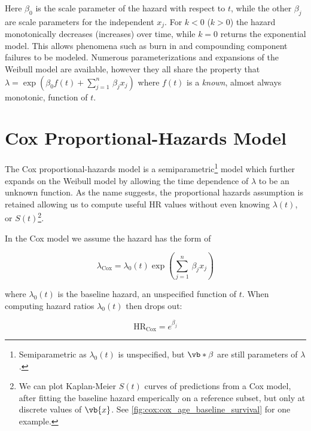 \noindent Here $\beta_{0}$ is the scale parameter of the hazard with respect to $t$,
while the other $\beta_{j}$ are scale parameters for the independent $x_{j}$.
For $k<0$ ($k>0$) the hazard monotonically decreases (increases) over time,
while $k=0$ returns the exponential model.
This allows phenomena such as burn in and compounding component failures to be modeled.
Numerous parameterizations and expansions of the Weibull model are available,
however they all share the property that
$\lambda = \exp\left(\beta_{0} f\left(t\right) + \sum_{j=1}^{n}\, \beta_{j} x_{j}\right)$
where $f\left(t\right)$ is a {\em known}, almost always monotonic, function of $t$.

\section{Cox Proportional-Hazards Model}
\label{survival:cox}

The Cox proportional-hazards model \cite{cox} is a
semiparametric\footnote{Semiparametric as $\lambda_{0}\left(t\right)$ is unspecified, but $\vb*{\beta}$ are still parameters of $\lambda$.} model
which further expands on the Weibull model by allowing
the time dependence of $\lambda$ to be an unknown function.
As the name suggests, the proportional hazards assumption is retained
allowing us to compute useful HR values
without even knowing $\lambda\left(t\right)$,
or $S\left(t\right)$\footnote{We can
plot Kaplan-Meier $S\left(t\right)$ curves of predictions from a Cox model,
after fitting the baseline hazard emperically on a reference subset,
but only at discrete values of $\vb{x}$.
See \cref{fig:cox:cox_age_baseline_survival} for one example.}.

In the Cox model we assume the hazard has the form of

\begin{equation}\label{eq:survival:cox_lambda}
\lambda_{\text{Cox}} = \lambda_{0}\left(t\right) \exp\left(\sum_{j=1}^{n}\, \beta_{j} x_{j}\right)
\end{equation}

\noindent where $\lambda_{0}\left(t\right)$ is the baseline hazard, an unspecified function of $t$.
When computing hazard ratios $\lambda_{0}\left(t\right)$ then drops out:

\begin{equation}\label{eq:survival:cox_HR}
\text{HR}_{\text{Cox}} = e^{\beta_{j}}
\end{equation}

